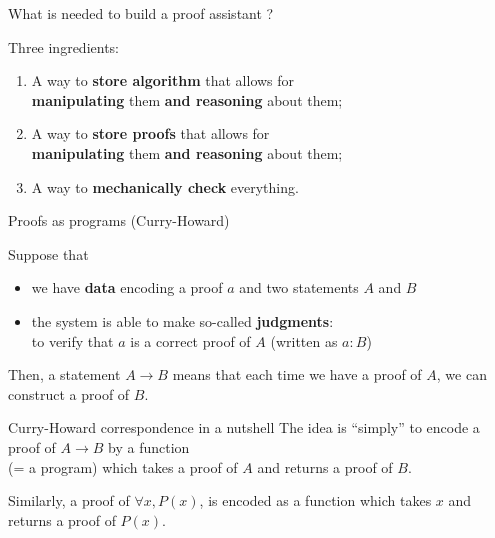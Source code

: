 \documentclass[compress,11pt]{beamer}
\newcommand{\red}[1]{{\color{red} #1}}
\begin{document}
\begin{frame}{What is needed to build a proof assistant ?}

Three ingredients:
\begin{enumerate}
\item A way to \textbf{\red{store algorithm}} that allows for\\
  \textbf{manipulating} them \textbf{and reasoning} about them;
\bigskip\pause

\item A way to \textbf{\red{store proofs}} that allows for\\
  \textbf{manipulating} them \textbf{and reasoning} about them;
\bigskip\pause

\item A way to \textbf{mechanically check} everything.
\end{enumerate}
\end{frame}

\begin{frame}{Proofs as programs (Curry-Howard)}

Suppose that
\begin{itemize}
\item we have \textbf{data} encoding a proof $a$ and two statements $A$ and
  $B$
\item the system is able to make so-called \textbf{judgments}: \\
  to verify that $a$ is a correct proof of $A$ (written as $a : B$)
\end{itemize}
\pause\medskip

Then, a statement $A \to B$ means that each time we have a proof of $A$, we
can construct a proof of $B$.
\pause\bigskip

\begin{block}{Curry-Howard correspondence in a nutshell}
  The idea is ``simply'' to encode a proof of $A \to B$ by a function\\
  (= a program) which takes a proof of $A$ and returns a proof of $B$.
  \bigskip

  Similarly, a proof of $\forall x, P(x)$, is encoded as a function which
  takes $x$ and returns a proof of $P(x)$.
\end{block}


\end{frame}
\end{document}
